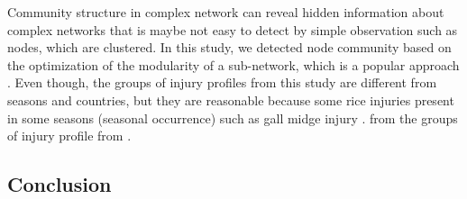 Community structure in complex network can reveal hidden information about complex networks that is maybe not easy to detect by simple observation such as nodes, which are clustered. In this study, we detected node community based on the optimization of the modularity of a sub-network, which is a popular approach \cite{Liu_2014_Detecting}. Even though, the groups of injury profiles from this study are different from seasons and countries, but they are reasonable because some rice injuries present in some seasons (seasonal occurrence) such as gall midge injury \cite{Krishnaiah_2004_Rice}. from the groups of injury profile from \cite{Savary_2000_Characterization}. 



\subsection{Conclusion}

